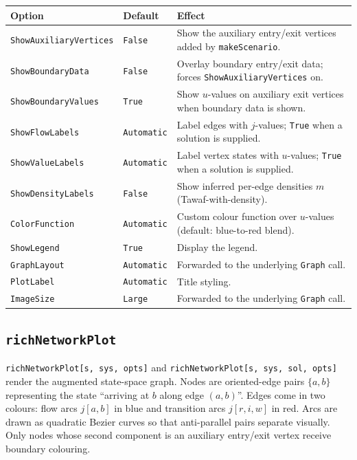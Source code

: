 \documentclass[11pt]{article}
\begin{document}
\begin{center}
\renewcommand{\arraystretch}{1.2}
\begin{longtable}{@{}p{4.2cm} p{2.4cm} p{8.4cm}@{}}
\toprule
\textbf{Option} & \textbf{Default} & \textbf{Effect} \\
\midrule
\endhead
\texttt{ShowAuxiliaryVertices} & \texttt{False} & Show the auxiliary entry/exit vertices added by \texttt{makeScenario}. \\
\texttt{ShowBoundaryData}      & \texttt{False} & Overlay boundary entry/exit data; forces \texttt{ShowAuxiliaryVertices} on. \\
\texttt{ShowBoundaryValues}    & \texttt{True}  & Show $u$-values on auxiliary exit vertices when boundary data is shown. \\
\texttt{ShowFlowLabels}        & \texttt{Automatic} & Label edges with $j$-values; \texttt{True} when a solution is supplied. \\
\texttt{ShowValueLabels}       & \texttt{Automatic} & Label vertex states with $u$-values; \texttt{True} when a solution is supplied. \\
\texttt{ShowDensityLabels}     & \texttt{False} & Show inferred per-edge densities $m$ (Tawaf-with-density). \\
\texttt{ColorFunction}         & \texttt{Automatic} & Custom colour function over $u$-values (default: blue-to-red blend). \\
\texttt{ShowLegend}            & \texttt{True}  & Display the legend. \\
\texttt{GraphLayout}           & \texttt{Automatic} & Forwarded to the underlying \texttt{Graph} call. \\
\texttt{PlotLabel}             & \texttt{Automatic} & Title styling. \\
\texttt{ImageSize}             & \texttt{Large} & Forwarded to the underlying \texttt{Graph} call. \\
\bottomrule
\end{longtable}
\end{center}

\subsection*{\texttt{richNetworkPlot}}

\texttt{richNetworkPlot[s, sys, opts]} and \texttt{richNetworkPlot[s, sys, sol, opts]} render the augmented state-space graph. Nodes are oriented-edge pairs $\{a, b\}$ representing the state ``arriving at $b$ along edge $(a, b)$''. Edges come in two colours: flow arcs $j[a, b]$ in blue and transition arcs $j[r, i, w]$ in red. Arcs are drawn as quadratic Bezier curves so that anti-parallel pairs separate visually. Only nodes whose second component is an auxiliary entry/exit vertex receive boundary colouring.
\end{document}
